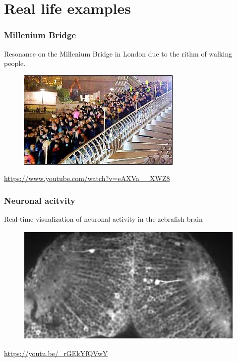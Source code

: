 \documentclass{beamer}
\begin{document}
\section{Real life examples} 

\begin{frame}
\frametitle{Millenium Bridge}
Resonance on the Millenium Bridge in London due to the rithm of walking people.
\begin{figure}
\includegraphics[scale=0.9]{Millenium_bridge}
\end{figure}
\url{https://www.youtube.com/watch?v=eAXVa__XWZ8}
\end{frame}


\begin{frame}
\frametitle{Neuronal acitvity}
Real-time visualization of neuronal activity in the zebrafish brain
\begin{figure}
\includegraphics[scale=0.35]{neuronal_activity}
\end{figure}
\url{https://youtu.be/_rGEkYfQVwY}
\end{frame}

\end{document}
